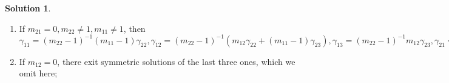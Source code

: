 \documentclass[a4paper,10pt]{amsart}
\theoremstyle{definition}
\newtheorem{solution}[theorem]{Solution}
\numberwithin{equation}{section}
\begin{document}
\begin{solution}
\begin{enumerate}
\item If $m_{21}=0,m_{22}\neq 1,m_{11}\neq1$, then $\gamma_{11}=(m_{22}-1)^{-1}(m_{11}-1)\gamma_{22},
    \gamma_{12}=(m_{22}-1)^{-1}(m_{12}\gamma_{22}+(m_{11}-1)\gamma_{23}),
    \gamma_{13}=(m_{22}-1)^{-1}m_{12}\gamma_{23},
    \gamma_{21}=0;$%


\item If $m_{12}=0$, there exit symmetric solutions of the last three ones, which we omit here;



\end{enumerate}
\end{solution}
\end{document}
